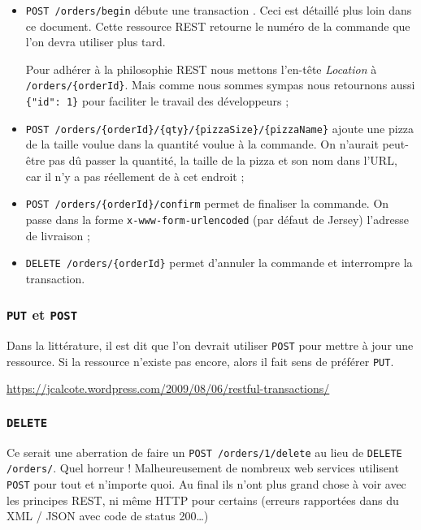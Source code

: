 \begin{itemize}
    \item \verb|POST /orders/begin| débute une transaction . Ceci est détaillé
                                    plus loin dans ce document. Cette ressource REST retourne le numéro
                                    de la commande que l'on devra utiliser plus tard.

                                    Pour adhérer à la philosophie REST nous mettons l'en-tête \emph{Location}
                                    à  \verb|/orders/{orderId}|. Mais comme nous sommes sympas nous retournons
                                    aussi \verb|{"id": 1}| pour faciliter le travail des développeurs ;

    \item \verb|POST /orders/{orderId}/{qty}/{pizzaSize}/{pizzaName}| ajoute une pizza de la taille voulue
            dans la quantité voulue à la commande. On n'aurait peut-être pas dû passer la quantité, la taille de
            la pizza et son nom dans l'URL, car il n'y a pas réellement de  à cet endroit ;

    \item \verb|POST /orders/{orderId}/confirm| permet de finaliser la commande. On passe dans la forme
            \verb|x-www-form-urlencoded| (par défaut de Jersey) l'adresse de livraison ;

    \item \verb|DELETE /orders/{orderId}| permet d'annuler la commande et interrompre la transaction.
\end{itemize}

\cprotect\subsubsection{\verb|PUT| et \verb|POST|}

Dans la littérature, il est dit que l'on devrait utiliser \verb|POST|  pour mettre à jour une ressource.
Si la ressource n'existe pas encore, alors il fait sens de préférer \verb|PUT|.

\url{https://jcalcote.wordpress.com/2009/08/06/restful-transactions/}

\cprotect\subsubsection{\verb|DELETE|}

Ce serait une aberration de faire un \verb|POST /orders/1/delete| au lieu de \verb|DELETE /orders/|.
Quel horreur ! Malheureusement de nombreux
web services utilisent \verb|POST| pour tout et n'importe quoi. Au final ils n'ont plus grand chose à voir
avec les principes REST, ni même HTTP pour certains  (erreurs rapportées
dans du XML / JSON avec code de status 200\dots)

